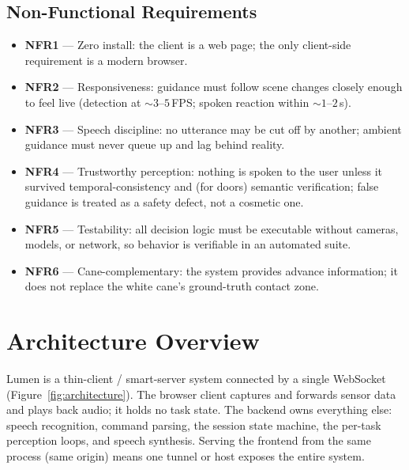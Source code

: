 \subsection{Non-Functional Requirements}
\begin{itemize}[nosep]
  \item \textbf{NFR1} --- Zero install: the client is a web page; the only
        client-side requirement is a modern browser.
  \item \textbf{NFR2} --- Responsiveness: guidance must follow scene changes closely
        enough to feel live (detection at ${\sim}3$--$5$\,FPS; spoken reaction
        within ${\sim}1$--$2$\,s).
  \item \textbf{NFR3} --- Speech discipline: no utterance may be cut off by another;
        ambient guidance must never queue up and lag behind reality.
  \item \textbf{NFR4} --- Trustworthy perception: nothing is spoken to the user
        unless it survived temporal-consistency and (for doors) semantic
        verification; false guidance is treated as a safety defect, not a cosmetic
        one.
  \item \textbf{NFR5} --- Testability: all decision logic must be executable without
        cameras, models, or network, so behavior is verifiable in an automated
        suite.
  \item \textbf{NFR6} --- Cane-complementary: the system provides advance
        information; it does not replace the white cane's ground-truth contact zone.
\end{itemize}

\section{Architecture Overview}
\label{sec:architecture}

Lumen is a thin-client / smart-server system connected by a single WebSocket
(Figure~\ref{fig:architecture}). The browser client captures and forwards sensor
data and plays back audio; it holds no task state. The backend owns everything else:
speech recognition, command parsing, the session state machine, the per-task
perception loops, and speech synthesis. Serving the frontend from the same process
(same origin) means one tunnel or host exposes the entire system.

